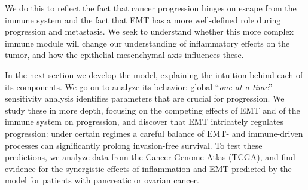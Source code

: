 \documentclass[11pt]{article}
\begin{document}
We do this to reflect the fact that cancer progression hinges on escape from the immune system and the fact that EMT has a more well-defined role during progression and metastasis.
We seek to understand whether this more complex immune module will change our understanding of inflammatory effects on the tumor, and how the epithelial-mesenchymal axis influences these.
\par 
In the next section we develop the model, explaining the intuition behind each of its components.
We go on to analyze its behavior: global ``{\em one-at-a-time}'' sensitivity analysis identifies parameters that are crucial for progression.
We study these in more depth, focusing on the competing effects of EMT and of the immune system on progression, and discover that EMT intricately regulates progression: under certain regimes a careful balance of EMT- and immune-driven processes can significantly prolong invasion-free survival.
To test these predictions, we analyze data from the Cancer Genome Atlas (TCGA), and find evidence for the synergistic effects of inflammation and EMT predicted by the model for patients with pancreatic or ovarian cancer.
\end{document}
